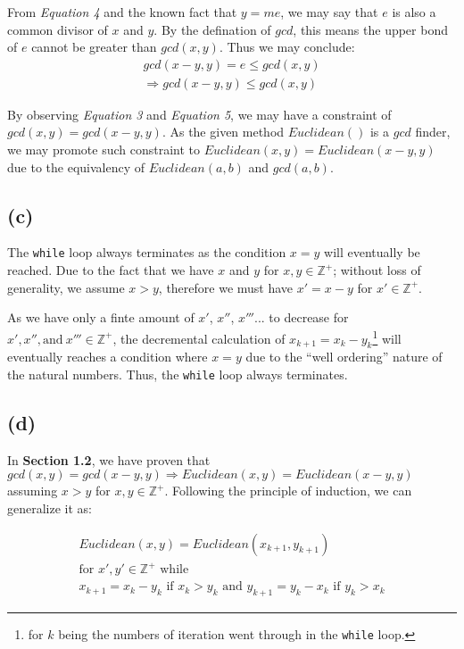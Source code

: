 \documentclass[12pt]{article}
\newcommand{\inlinecode}{\texttt}
\begin{document}
From \textit{Equation 4} and the known fact that $y = me$, we may say that $e$ is also a common divisor of $x$ and $y$. By the defination of $gcd$, this means the upper bond of $e$ cannot be greater than $gcd(x, y)$. Thus we may conclude:
\begin{gather}
    gcd(x-y, y) = e \leq gcd(x, y) \nonumber  \\
    \Rightarrow gcd(x-y, y) \leq gcd(x, y)
\end{gather}

By observing \textit{Equation 3} and \textit{Equation 5}, we may have a constraint of $gcd(x, y) = gcd(x-y, y)$. As the given method $Euclidean()$ is a $gcd$ finder, we may promote such constraint to $Euclidean(x, y) = Euclidean(x - y, y)$ due to the equivalency of $Euclidean(a, b)$ and $gcd(a, b)$.

\subsection{(c)}

The \inlinecode{while} loop always terminates as the condition $x = y$ will eventually be reached. Due to the fact that we have $x$ and $y$ for $x, y \in \mathbb{Z^+}$; without loss of generality, we assume $x > y$, therefore we must have $x' = x - y$ for $x' \in \mathbb{Z^+}$.

As we have only a finte amount of $x'$, $x''$, $x'''$... to decrease for $x', x'', \text{and}\ x''' \in \mathbb{Z^+}$, the decremental calculation of $x_{k+1} = x_{k} - y_{k}$\footnote{for $k$ being the numbers of iteration went through in the \inlinecode{while} loop.} will eventually reaches a condition where $x = y$ due to the ``well ordering'' nature of the natural numbers. Thus, the \inlinecode{while} loop always terminates.

\subsection{(d)}

In \textbf{Section 1.2}, we have proven that $gcd(x, y) = gcd(x-y, y) \Rightarrow Euclidean(x, y) = Euclidean(x - y, y)$ assuming $x > y$ for $x, y \in \mathbb{Z^+}$. Following the principle of induction, we can generalize it as:

\begin{gather}
    Euclidean(x, y) = Euclidean(x_{k+1}, y_{k+1}) \\
    \text{for $x', y' \in \mathbb{Z^+}$ while } \nonumber \\
    \text{$x_{k+1} = x_{k} - y_{k}$ if $x_{k} > y_{k}$ and $y_{k+1} = y_{k} - x_{k}$ if $y_{k} > x_{k}$} \nonumber
\end{gather}
\end{document}
